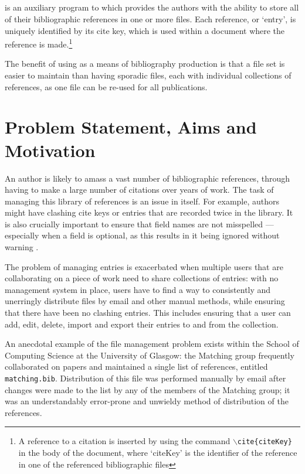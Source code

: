 \subsection{\bibtex}
\bibtex{} is an auxiliary program to \latex which provides the authors with the ability to store all of their bibliographic references in one or more files.  Each reference, or `entry', is uniquely identified by its cite key, which is used within a document where the reference is made.\footnote{A reference to a citation is inserted by using the \latex command \texttt{$\backslash$cite\{citeKey\}} in the body of the document, where `citeKey' is the identifier of the reference in one of the referenced bibliographic files}

The benefit of using \bibtex{} as a means of bibliography production is that a file set is easier to maintain than having sporadic files, each with individual collections of references, as one file can be re-used for all publications.

\section{Problem Statement, Aims and Motivation}
An author is likely to amass a vast number of bibliographic references, through having to make a large number of citations over years of work.  The task of managing this library of references is an issue in itself.  For example, authors might have clashing cite keys or entries that are recorded twice in the library.  It is also crucially important to ensure that field names are not misspelled --- especially when a field is optional, as this results in it being ignored without warning \cite{OP88}.

The problem of managing entries is exacerbated when multiple users that are collaborating on a piece of work need to share collections of entries: with no management system in place, users have to find a way to consistently and unerringly distribute files by email and other manual methods, while ensuring that there have been no clashing entries.  This includes ensuring that a user can add, edit, delete, import and export their entries to and from the collection.

An anecdotal example of the \bibtex{} file management problem exists within the School of Computing Science at the University of Glasgow: the Matching group frequently collaborated on papers and maintained a single list of references, entitled \texttt{matching.bib}.  Distribution of this file was performed manually by email after changes were made to the list by any of the members of the Matching group; it was an understandably error-prone and unwieldy method of distribution of the references.

